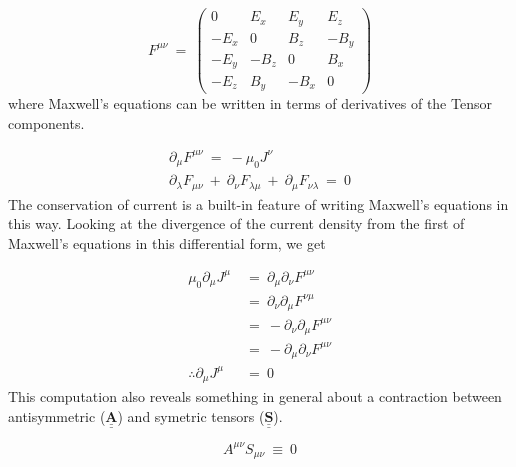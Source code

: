 \begin{equation}
  F^{\mu\nu}\ =\
  \begin{pmatrix}
    0 & E_x & E_y & E_z \\
    -E_x & 0 & B_z & -B_y \\
    -E_y & -B_z & 0 & B_x \\
    -E_z & B_y & -B_x & 0 
  \end{pmatrix}
\end{equation}
where Maxwell's equations can be written in terms of derivatives of the Tensor components.

\begin{gather}
  \partial_{\mu}F^{\mu\nu}\ =\ -\mu_0J^{\nu} \\
  \partial_{\lambda}F_{\mu\nu}\ +\ \partial_{\nu}F_{\lambda\mu}\ +\ \partial_{\mu}F_{\nu\lambda}\ =\ 0
\end{gather}
The conservation of current is a built-in feature of writing Maxwell's equations in this way.  Looking at the divergence of the current density from the first of Maxwell's equations in this differential form, we get

\begin{equation}
  \begin{aligned}
    \mu_0\partial_{\mu}J^{\mu}\ &=\ \partial_{\mu}\partial_{\nu}F^{\mu\nu} \\
    &=\ \partial_{\nu}\partial_{\mu}F^{\nu\mu} \\
    &=\ -\partial_{\nu}\partial_{\mu}F^{\mu\nu} \\
    &=\ -\partial_{\mu}\partial_{\nu}F^{\mu\nu} \\
    \therefore \partial_{\mu}J^{\mu}\ &=\ 0
  \end{aligned}
\end{equation}
This computation also reveals something in general about a contraction between antisymmetric ($\underline{\underline{\mathbf{A}}}$) and symetric tensors ($\underline{\underline{\mathbf{S}}}$).

\begin{equation}
  A^{\mu\nu}S_{\mu\nu}\ \equiv\ 0
\end{equation}
